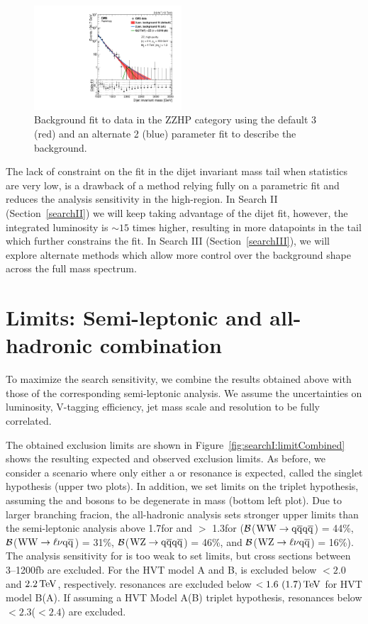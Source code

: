 \begin{figure}[h!]
\centering
\includegraphics[width=0.49\textwidth]{figures/analysis/search1/misc/CMS-PAS-EXO-15-002_Figure_004-e.pdf}
\caption{Background fit to data in the ZZHP category using the default 3 (red) and an alternate 2 (blue) parameter fit to describe the background.}
\label{fig:app:ZZHP2vs3p}
\end{figure}


The lack of constraint on the fit in the dijet invariant mass tail when statistics are very low, is a drawback of a method relying fully on a parametric fit and reduces the analysis sensitivity in the high-\mjj region. In Search II (Section~\ref{searchII}) we will keep taking advantage of the dijet fit, however, the integrated luminosity is $\sim 15$ times higher, resulting in more datapoints in the \mjj tail which further constrains the fit. In Search III (Section~\ref{searchIII}), we will explore alternate methods which allow more control over the background shape across the full mass spectrum. 

\section{Limits: Semi-leptonic and all-hadronic combination}
\label{sec:searchI:resultsComb}

To maximize the search sensitivity, we combine the results obtained above with those of the corresponding semi-leptonic analysis. We assume the uncertainties on luminosity, V-tagging efficiency, jet mass scale and resolution to be fully correlated.

The obtained exclusion limits are shown in Figure~\ref{fig:searchI:limitCombined} shows the resulting expected and observed
exclusion limits. As before, we consider a scenario where only either a \PWpr or \PZpr resonance is expected, called the singlet hypothesis (upper two plots). In addition, we set limits on the triplet hypothesis, assuming the \PWpr and \PZpr bosons to be degenerate in mass (bottom left plot).
Due to larger branching fracion, the all-hadronic analysis sets stronger upper limits than the semi-leptonic analysis above 1.7\TeV for \PZpr and $>$ 1.3\TeV for \PWpr ($\cal B$($\mathrm{W}\mathrm{W}\to\mathrm{q}\overline{\mathrm{q}}\mathrm{q}\overline{\mathrm{q}}$) = 44\%, $\cal B$($\mathrm{W}\mathrm{W}\to\ell\nu\mathrm{q}\overline{\mathrm{q}}$) = 31\%, $\cal B$($\mathrm{W}\mathrm{Z}\to\mathrm{q}\overline{\mathrm{q}}\mathrm{q}\overline{\mathrm{q}}$) = 46\%, and $\cal B$($\mathrm{W}\mathrm{Z}\to\ell\nu\mathrm{q}\overline{\mathrm{q}}$) = 16\%). 
The analysis sensitivity for \BulkG is too weak to set limits, but cross sections between 3--1200\unit{fb} are excluded.
For the HVT model A and B, \PWpr is excluded below $< 2.0$ and $2.2 \,\text{Te\hspace{-.08em}V}$, respectively. \PZpr resonances are excluded below $< 1.6~(1.7)\,\text{Te\hspace{-.08em}V}$ for HVT model B(A). If assuming a HVT Model A(B) triplet hypothesis, resonances below $< 2.3$($< 2.4$) \TeV are excluded.


